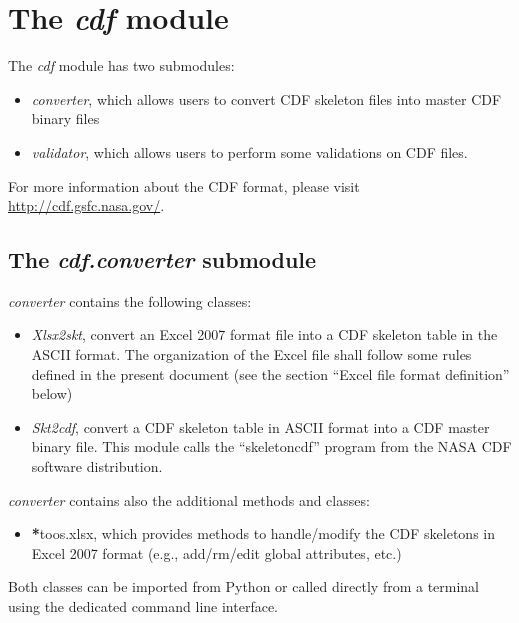 \documentclass[letterpaper,10pt,english]{sphinxmanual}
\begin{document}
\chapter{The \emph{cdf} module}
\label{cdf:the-cdf-module}\label{cdf::doc}
The \emph{cdf} module has two submodules:
\begin{itemize}
\item {} 
\emph{converter}, which allows users to convert CDF skeleton files into master CDF binary files

\item {} 
\emph{validator}, which allows users to perform some validations on CDF files.

\end{itemize}

For more information about the CDF format, please visit \href{http://cdf.gsfc.nasa.gov/}{http://cdf.gsfc.nasa.gov/}.


\section{The \emph{cdf.converter} submodule}
\label{cdf:the-cdf-converter-submodule}
\emph{converter} contains the following classes:
\begin{itemize}
\item {} 
\emph{Xlsx2skt}, convert an Excel 2007 format file into a CDF skeleton table in the ASCII format. The organization of the Excel file shall follow some rules defined in the present document (see the section ``Excel file format definition'' below)

\item {} 
\emph{Skt2cdf}, convert a CDF skeleton table in ASCII format into a CDF master binary file. This module calls the ``skeletoncdf'' program from the NASA CDF software distribution.

\end{itemize}

\emph{converter} contains also the additional methods and classes:
\begin{itemize}
\item {} 
{\color{red}\bfseries{}*}toos.xlsx, which provides methods to handle/modify the CDF skeletons in Excel 2007 format (e.g., add/rm/edit global attributes, etc.)

\end{itemize}

Both classes can be imported from Python or called directly from a terminal using the dedicated command line interface.
\end{document}
